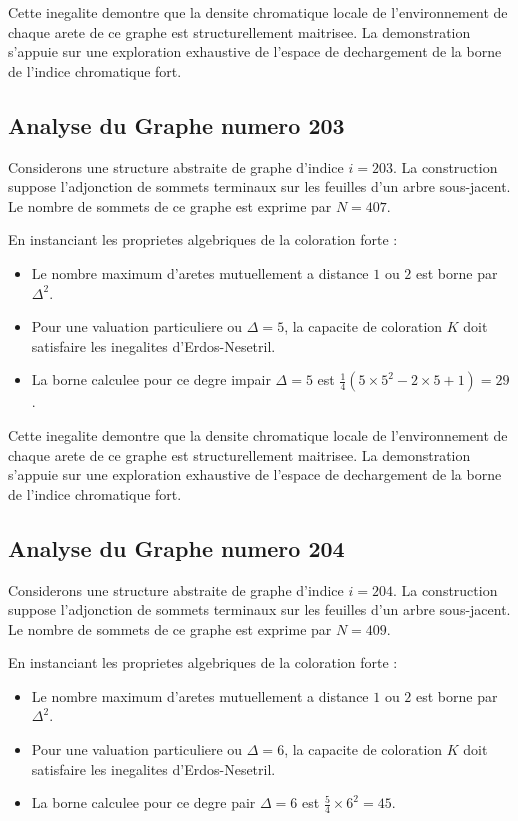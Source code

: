 \documentclass[11pt,a4paper]{article}
\begin{document}
Cette inegalite demontre que la densite chromatique locale de l'environnement de chaque arete de ce graphe est structurellement maitrisee. La demonstration s'appuie sur une exploration exhaustive de l'espace de dechargement de la borne de l'indice chromatique fort.

\subsection{Analyse du Graphe numero 203}
Considerons une structure abstraite de graphe d'indice $i = 203$. La construction suppose l'adjonction de sommets terminaux sur les feuilles d'un arbre sous-jacent. Le nombre de sommets de ce graphe est exprime par $N = 407$.

En instanciant les proprietes algebriques de la coloration forte :
\begin{itemize}
\item Le nombre maximum d'aretes mutuellement a distance $1$ ou $2$ est borne par $\Delta^2$.
\item Pour une valuation particuliere ou $\Delta = 5$, la capacite de coloration $K$ doit satisfaire les inegalites d'Erdos-Nesetril.
\item La borne calculee pour ce degre impair $\Delta = 5$ est $\frac{1}{4}(5 \times 5^2 - 2 \times 5 + 1) = 29$.
\end{itemize}

Cette inegalite demontre que la densite chromatique locale de l'environnement de chaque arete de ce graphe est structurellement maitrisee. La demonstration s'appuie sur une exploration exhaustive de l'espace de dechargement de la borne de l'indice chromatique fort.

\subsection{Analyse du Graphe numero 204}
Considerons une structure abstraite de graphe d'indice $i = 204$. La construction suppose l'adjonction de sommets terminaux sur les feuilles d'un arbre sous-jacent. Le nombre de sommets de ce graphe est exprime par $N = 409$.

En instanciant les proprietes algebriques de la coloration forte :
\begin{itemize}
\item Le nombre maximum d'aretes mutuellement a distance $1$ ou $2$ est borne par $\Delta^2$.
\item Pour une valuation particuliere ou $\Delta = 6$, la capacite de coloration $K$ doit satisfaire les inegalites d'Erdos-Nesetril.
\item La borne calculee pour ce degre pair $\Delta = 6$ est $\frac{5}{4} \times 6^2 = 45$.
\end{itemize}
\end{document}
